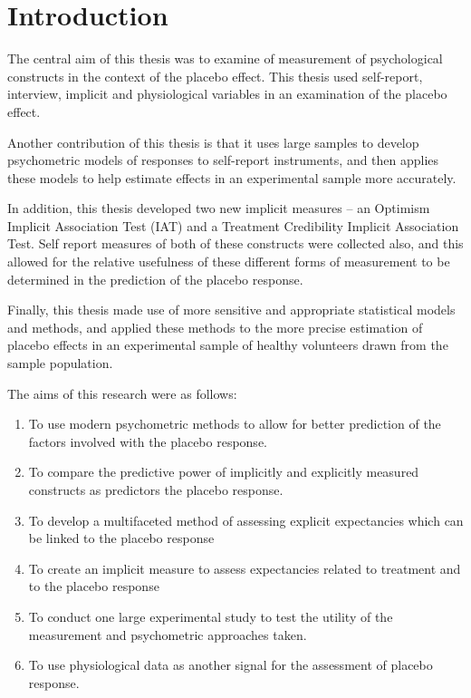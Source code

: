 \chapter{Introduction}


The central aim of this thesis was to examine of measurement of psychological constructs in the context of the placebo effect. This thesis used self-report, interview, implicit and physiological variables in an examination of the placebo effect. 


Another contribution of this thesis is that it uses large samples to develop psychometric models of responses to self-report instruments, and then applies these models to help estimate effects in an experimental sample more accurately. 

In addition, this thesis developed two new implicit measures -- an Optimism Implicit Association Test (IAT) and a Treatment Credibility Implicit Association Test. Self report measures of both of these constructs were collected also, and this allowed for the relative usefulness of these different forms of measurement to be determined in the prediction of the placebo response. 

Finally, this thesis  made use of more sensitive and appropriate statistical models and methods, and applied these methods to the more precise estimation of placebo effects in an experimental sample of healthy volunteers drawn from the sample population. 


The aims of this research were as follows:


\begin{enumerate}

\item To use modern psychometric methods to allow for better prediction of the factors involved with the placebo response. 

\item To compare the predictive power of implicitly and explicitly measured constructs as predictors the placebo response. 

\item To develop a multifaceted method of assessing explicit expectancies which can be linked to the placebo response

\item To create an implicit measure to assess expectancies related to treatment and to the placebo response

\item To conduct one large experimental study to test the utility of the measurement and psychometric approaches taken. 

\item To use physiological data as another signal for the assessment of placebo response. 
\end{enumerate}

